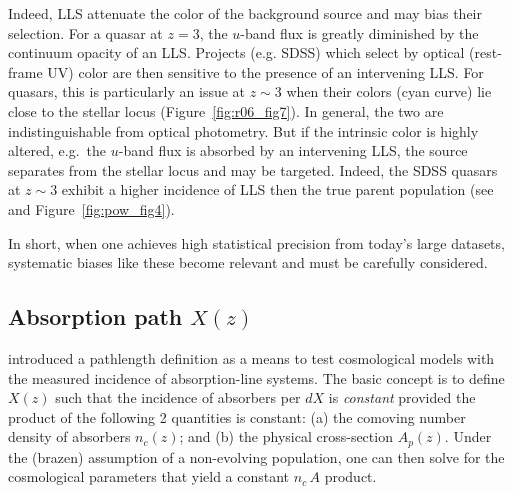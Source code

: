 \documentclass[graybox]{svmult}
\begin{document}
Indeed, LLS attenuate the color of the 
background source  and may bias their selection. 
For a quasar at $z=3$, the
$u$-band flux is greatly diminished by the continuum
opacity of an LLS.  Projects (e.g. SDSS) which 
select by optical (rest-frame UV) color
are then sensitive to the presence of an
intervening LLS.  For quasars, this is particularly
an issue at $z \sim 3$ when
their colors (cyan curve) lie close to the stellar locus
(Figure~\ref{fig:r06_fig7}).
In general, the two are indistinguishable from optical
photometry.  But if the intrinsic color is highly altered,
e.g.\ the $u$-band flux is absorbed by an intervening LLS,
the source separates from the stellar locus and may be
targeted.  Indeed, the SDSS quasars at $z \sim 3$ exhibit
a higher incidence of LLS then the true parent population
(see \cite{pow10} and Figure~\ref{fig:pow_fig4}).

In short, when one achieves high statistical precision
from today's large datasets, systematic biases like
these become relevant and must be carefully considered.

\subsection{Absorption path $X(z)$}

\cite{bp69} introduced a pathlength definition as a means to test 
cosmological models with the measured incidence of 
absorption-line systems.
The basic concept is to
define $X(z)$ such that the incidence of absorbers per $dX$
is {\it constant} provided the product of the following 2 
quantities is constant:
(a) the comoving number density of absorbers $n_c(z)$;
and
(b) the physical cross-section $A_p(z)$.
Under the (brazen) assumption of a non-evolving population, one can
then solve for the cosmological parameters that yield a
constant $n_c \, A$ product.
\end{document}
